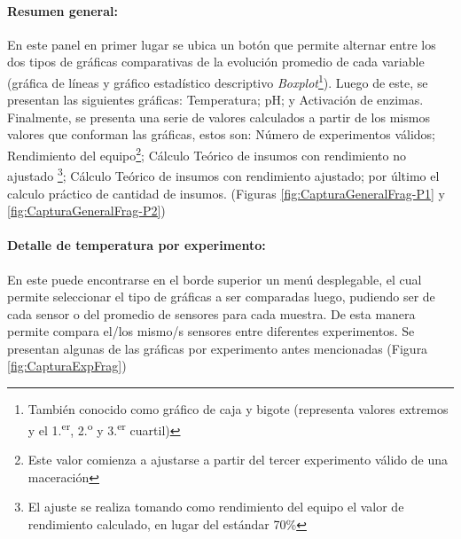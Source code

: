             \paragraph{Resumen general:} En este panel en primer lugar se ubica un botón que permite alternar entre los dos tipos de gráficas comparativas de la evolución promedio de cada variable (gráfica de líneas y gráfico estadístico descriptivo \textit{Boxplot}\footnote{También conocido como gráfico de caja y bigote (representa valores extremos y el 1.\textsuperscript{er}, 2.\textsuperscript{o} y 3.\textsuperscript{er} cuartil)}). Luego de este, se presentan las siguientes gráficas: Temperatura; pH; y Activación de enzimas. Finalmente, se presenta una serie de valores calculados a partir de los mismos valores que conforman las gráficas, estos son: Número de experimentos válidos; Rendimiento del equipo\footnote{Este valor comienza a ajustarse a partir del tercer experimento válido de una maceración}; Cálculo Teórico de insumos con rendimiento no ajustado \footnote{El ajuste se realiza tomando como rendimiento del equipo el valor de rendimiento calculado, en lugar del estándar 70\%}; Cálculo Teórico de insumos con rendimiento ajustado; por último el calculo práctico de cantidad de insumos. (Figuras \ref{fig:CapturaGeneralFrag-P1} y \ref{fig:CapturaGeneralFrag-P2}) 
            
            \paragraph{Detalle de temperatura por experimento:} En este puede encontrarse en el borde superior un menú desplegable, el cual permite seleccionar el tipo de gráficas a ser comparadas luego, pudiendo ser de cada sensor o del promedio de sensores para cada muestra. De esta manera permite compara el/los mismo/s sensores entre diferentes experimentos. Se presentan algunas de las gráficas por experimento antes mencionadas (Figura \ref{fig:CapturaExpFrag})
            
